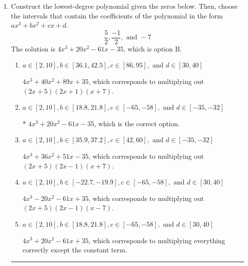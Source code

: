 \documentclass{extbook}[14pt]
\newcommand{\litem}[1]{\item #1

\rule{\textwidth}{0.4pt}}
\begin{document}
\begin{enumerate}\litem{
Construct the lowest-degree polynomial given the zeros below. Then, choose the intervals that contain the coefficients of the polynomial in the form $ax^3+bx^2+cx+d$.
\[ \frac{5}{2}, \frac{-1}{2}, \text{ and } -7 \]The solution is \( 4x^{3} +20 x^{2} -61 x -35 \), which is option B.\begin{enumerate}[label=\Alph*.]
\item \( a \in [2, 10], b \in [36.1, 42.5], c \in [86, 95], \text{ and } d \in [30, 40] \)

$4x^{3} +40 x^{2} +89 x + 35$, which corresponds to multiplying out $(2x + 5)(2x + 1)(x + 7)$.
\item \( a \in [2, 10], b \in [18.8, 21.8], c \in [-65, -58], \text{ and } d \in [-35, -32] \)

* $4x^{3} +20 x^{2} -61 x -35$, which is the correct option.
\item \( a \in [2, 10], b \in [35.9, 37.2], c \in [42, 60], \text{ and } d \in [-35, -32] \)

$4x^{3} +36 x^{2} +51 x -35$, which corresponds to multiplying out $(2x + 5)(2x -1)(x + 7)$.
\item \( a \in [2, 10], b \in [-22.7, -19.9], c \in [-65, -58], \text{ and } d \in [30, 40] \)

$4x^{3} -20 x^{2} -61 x + 35$, which corresponds to multiplying out $(2x + 5)(2x -1)(x -7)$.
\item \( a \in [2, 10], b \in [18.8, 21.8], c \in [-65, -58], \text{ and } d \in [30, 40] \)

$4x^{3} +20 x^{2} -61 x + 35$, which corresponds to multiplying everything correctly except the constant term.
\end{enumerate}

}
\end{enumerate}
\end{document}
